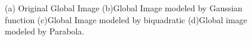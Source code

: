 \begin{figure}[t]
{\label{fig:subfig2} }   \caption[Optional caption for list of figures] {(a)
Original Global Image (b)Global Image modeled by Gaussian function (c)Global
Image modeled by biquadratic (d)Global image modeled by Parabola.}
\label{fig:globalCloth}
\end{figure}


